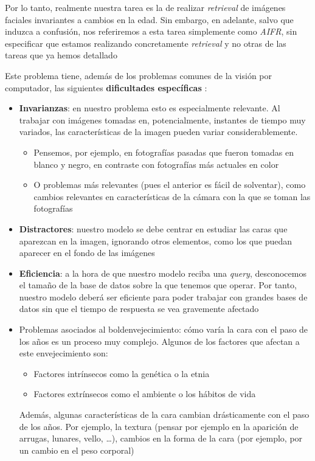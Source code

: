 Por lo tanto, realmente nuestra tarea es la de realizar \textit{retrieval} de imágenes faciales invariantes a cambios en la edad. Sin embargo, en adelante, salvo que induzca a confusión, nos referiremos a esta tarea simplemente como \textit{AIFR}, sin especificar que estamos realizando concretamente \textit{retrieval} y no otras de las tareas que ya hemos detallado

Este problema tiene, además de los problemas comunes de la visión por computador, las siguientes \textbf{dificultades específicas} \cite{informatica:challenges_retrieval}:

\begin{itemize}
    \item \textbf{Invarianzas}: en nuestro problema esto es especialmente relevante. Al trabajar con imágenes tomadas en, potencialmente, instantes de tiempo muy variados, las características de la imagen pueden variar considerablemente.
        \begin{itemize}
            \item Pensemos, por ejemplo, en fotografías pasadas que fueron tomadas en blanco y negro, en contraste con fotografías más actuales en color
            \item O problemas más relevantes (pues el anterior es fácil de solventar), como cambios relevantes en características de la cámara con la que se toman las fotografías
        \end{itemize}
    \item \textbf{Distractores}: nuestro modelo se debe centrar en estudiar las caras que aparezcan en la imagen, ignorando otros elementos, como los que puedan aparecer en el fondo de las imágenes
    \item \textbf{Eficiencia}: a la hora de que nuestro modelo reciba una \textit{query}, desconocemos el tamaño de la base de datos sobre la que tenemos que operar. Por tanto, nuestro modelo deberá ser eficiente para poder trabajar con grandes bases de datos sin que el tiempo de respuesta se vea gravemente afectado
    \item Problemas asociados al bold{envejecimiento}: cómo varía la cara con el paso de los años es un proceso muy complejo. Algunos de los factores que afectan a este envejecimiento \cite{informatica:tecnica_sintesis_aifr} son:
        \begin{itemize}
            \item Factores intrínsecos como la genética o la etnia
            \item Factores extrínsecos como el ambiente o los hábitos de vida
        \end{itemize}
    Además, algunas características de la cara cambian drásticamente con el paso de los años. Por ejemplo, la textura (pensar por ejemplo en la aparición de arrugas, lunares, vello, \ldots), cambios en la forma de la cara (por ejemplo, por un cambio en el peso corporal)


\end{itemize}
